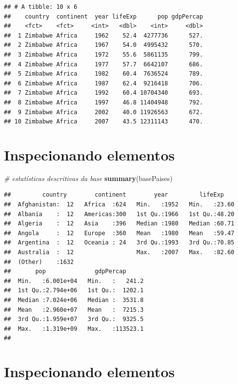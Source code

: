 \documentclass[
]{article}
\newenvironment{Shaded}{\begin{snugshade}}{\end{snugshade}}
\newcommand{\CommentTok}[1]{\textcolor[rgb]{0.56,0.35,0.01}{\textit{#1}}}
\newcommand{\KeywordTok}[1]{\textcolor[rgb]{0.13,0.29,0.53}{\textbf{#1}}}
\newcommand{\NormalTok}[1]{#1}
\begin{document}
\begin{verbatim}
## # A tibble: 10 x 6
##    country  continent  year lifeExp      pop gdpPercap
##    <fct>    <fct>     <int>   <dbl>    <int>     <dbl>
##  1 Zimbabwe Africa     1962    52.4  4277736      527.
##  2 Zimbabwe Africa     1967    54.0  4995432      570.
##  3 Zimbabwe Africa     1972    55.6  5861135      799.
##  4 Zimbabwe Africa     1977    57.7  6642107      686.
##  5 Zimbabwe Africa     1982    60.4  7636524      789.
##  6 Zimbabwe Africa     1987    62.4  9216418      706.
##  7 Zimbabwe Africa     1992    60.4 10704340      693.
##  8 Zimbabwe Africa     1997    46.8 11404948      792.
##  9 Zimbabwe Africa     2002    40.0 11926563      672.
## 10 Zimbabwe Africa     2007    43.5 12311143      470.
\end{verbatim}

\hypertarget{inspecionando-elementos-2}{%
\section{Inspecionando elementos}\label{inspecionando-elementos-2}}

\begin{Shaded}
\begin{Highlighting}[]
\CommentTok{# estatísticas descritivas da base}
\KeywordTok{summary}\NormalTok{(basePaises)}
\end{Highlighting}
\end{Shaded}

\begin{verbatim}
##         country        continent        year         lifeExp     
##  Afghanistan:  12   Africa  :624   Min.   :1952   Min.   :23.60  
##  Albania    :  12   Americas:300   1st Qu.:1966   1st Qu.:48.20  
##  Algeria    :  12   Asia    :396   Median :1980   Median :60.71  
##  Angola     :  12   Europe  :360   Mean   :1980   Mean   :59.47  
##  Argentina  :  12   Oceania : 24   3rd Qu.:1993   3rd Qu.:70.85  
##  Australia  :  12                  Max.   :2007   Max.   :82.60  
##  (Other)    :1632                                                
##       pop              gdpPercap       
##  Min.   :6.001e+04   Min.   :   241.2  
##  1st Qu.:2.794e+06   1st Qu.:  1202.1  
##  Median :7.024e+06   Median :  3531.8  
##  Mean   :2.960e+07   Mean   :  7215.3  
##  3rd Qu.:1.959e+07   3rd Qu.:  9325.5  
##  Max.   :1.319e+09   Max.   :113523.1  
## 
\end{verbatim}

\hypertarget{inspecionando-elementos-3}{%
\section{Inspecionando elementos}\label{inspecionando-elementos-3}}
\end{document}
